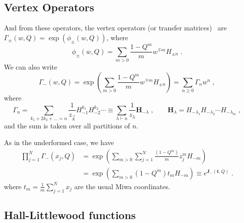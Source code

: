 
\subsection{Vertex Operators}

And from these operators, the vertex operators (or transfer matrices)~\cite{Jing1991, Jing1995}
are \(\Gamma_\pm(w,Q)=\exp (\phi_\pm(w,Q))\), where
\begin{equation}
\phi_\pm(w,Q) = \sum_{m>0} \frac{1-Q^m}{m} w^{\mp m} H_{\pm n}\; .
\end{equation}
We can also write
\begin{equation}
    \Gamma_-(w,Q)  = \exp\left( \sum_{m>0} \frac{1-Q^m}{m} w^{\mp m} H_{\pm n} \right)
    = \sum_{n\geq 0} \Gamma_n w^n  \; ,
\end{equation}
where
\begin{equation}
  \Gamma_n = \sum_{k_1 + 2k_2 + \dots = n} \frac{1}{z_{\vec{k}}} H_{-1}^{k_1} H_{-2}^{k_2}\cdots
    \equiv \sum_{\lambda \vdash n} \frac{1}{z_{\lambda}} \bm{H}_{-\lambda} \; , \qquad 
 \bm{H}_{\lambda} = H_{-\lambda_1} H_{-\lambda_2}\cdots H_{-\lambda_m}\; , 
\end{equation}
and the sum is taken over all partitions of \(n\).

As in the underformed case, we have
\begin{equation}
 \begin{split}
    \prod_{j=1}^N \Gamma_- (x_j, Q) &
    = \exp \left( \sum_{m>0} \sum_{j=1}^N \frac{(1 - Q^m)}{m} z_j^m H_{-m}
    \right) \\ 
    & = \exp \left( \sum_{m>0} (1 - Q^m) t_m H_{-m} \right) \equiv e^{\bm{J}_-(\bm{t}, Q)}\; .
 \end{split}
\end{equation}
where \(t_m = \frac{1}{m} \sum_{j=1}^N x_j\) are the usual Miwa
coordinates.



\subsection{Hall-Littlewood functions}

